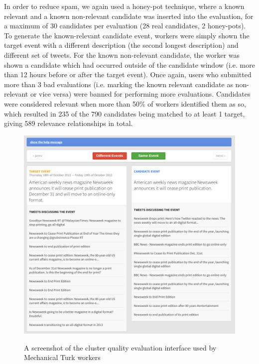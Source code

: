 In order to reduce spam, we again used a honey-pot technique, where a known relevant and a known non-relevant candidate was inserted into the evaluation, for a maximum of 30 candidates per evaluation (28 real candidates, 2 honey-pots).
To generate the known-relevant candidate event, workers were simply shown the target event with a different description (the second longest description) and different set of tweets.
For the known non-relevant candidate, the worker was shown a candidate which had occurred outside of the candidate window (i.e. more than 12 hours before or after the target event).
Once again, users who submitted more than 3 bad evaluations (i.e. marking the known relevant candidate as non-relevant or vice versa) were banned for performing more evaluations.
Candidates were considered relevant when more than 50\% of workers identified them as so, which resulted in 235 of the 790 candidates being matched to at least 1 target, giving 589 relevance relationships in total.

\begin{figure}[]
	{\includegraphics[width=\textwidth]{./Chapters/Collection/images/cluster_eval}}
	\caption{A screenshot of the cluster quality evaluation interface used by Mechanical Turk workers}
	\label{fig:clusteringscreenshot}
\end{figure}